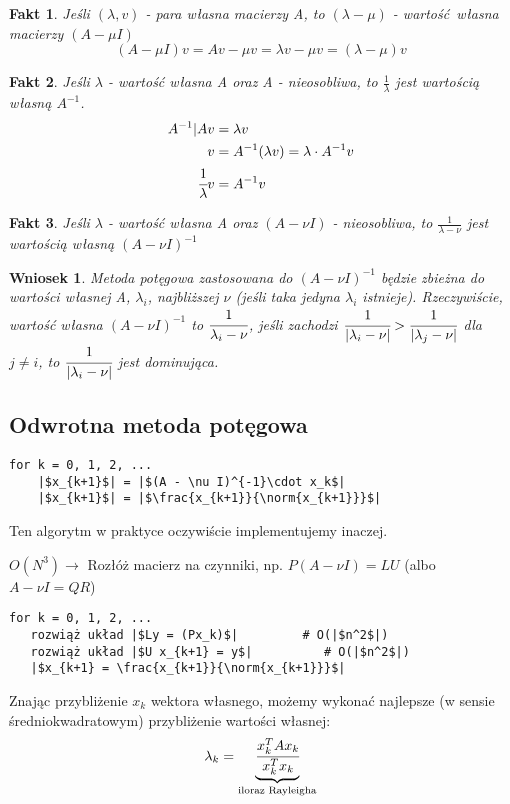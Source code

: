 \documentclass[hidelinks,a4paper,fleqn,oneside]{book}
\newcommand{\ra}{\rightarrow}
\newcommand{\norm}[1]{\left\lVert#1\right\rVert}
\newtheorem{wniosek}{Wniosek}
\newtheorem{fakt}{Fakt}
\begin{document}

\begin{fakt} 
	Jeśli $(\lambda, v)$ - para własna macierzy A, to $(\lambda - \mu)$ - wartość własna macierzy $(A - \mu I)$
	\[
		(A - \mu I)v = Av - \mu v = \lambda v - \mu v = (\lambda - \mu)v
	\]
\end{fakt} 

\begin{fakt} Jeśli $\lambda$ - wartość własna A oraz A - nieosobliwa, to $\frac{1}{\lambda}$ jest wartością własną $A^{-1}$.
	\begin{equation}
		\begin{aligned}
			A^{-1}| Av           & = \lambda v                                  \\
			v                    & = A^{-1}(\lambda v) = \lambda \cdot A^{-1} v \\
			\cfrac{1}{\lambda} v & = A^{-1}v                                    
		\end{aligned}
	\end{equation}
\end{fakt}

\begin{fakt} Jeśli $\lambda$ - wartość własna A oraz $(A - \nu I)$ - nieosobliwa, to $\frac{1}{\lambda - \nu}$ jest wartością własną $(A - \nu I)^{-1}$
\end{fakt}

\begin{wniosek} Metoda potęgowa zastosowana do $(A - \nu I)^{-1}$ będzie zbieżna do wartości własnej A, $\lambda_i$, najbliższej $\nu$ (jeśli taka jedyna $\lambda_i$ istnieje). Rzeczywiście, wartość własna $(A - \nu I)^{-1}$ to $\cfrac{1}{\lambda_i - \nu}$, jeśli zachodzi $\cfrac{1}{|\lambda_i - \nu|} > \cfrac{1}{|\lambda_j - \nu|}$ dla $j \neq i$, to $\cfrac{1}{|\lambda_i - \nu|}$ jest dominująca.
\end{wniosek}

\subsection{Odwrotna metoda potęgowa}
\begin{verbatim}
for k = 0, 1, 2, ...
    |$x_{k+1}$| = |$(A - \nu I)^{-1}\cdot x_k$|
    |$x_{k+1}$| = |$\frac{x_{k+1}}{\norm{x_{k+1}}}$|
\end{verbatim}
Ten algorytm w praktyce oczywiście implementujemy inaczej.

$O(N^3) \ra $ Rozłóż macierz na czynniki, np. $P(A-\nu I) = LU$ (albo $A - \nu I = QR$)
\begin{verbatim}
for k = 0, 1, 2, ...
   rozwiąż układ |$Ly = (Px_k)$|         # O(|$n^2$|)
   rozwiąż układ |$U x_{k+1} = y$|          # O(|$n^2$|)
   |$x_{k+1} = \frac{x_{k+1}}{\norm{x_{k+1}}}$|
\end{verbatim}
Znając przybliżenie $x_k$ wektora własnego, możemy wykonać najlepsze (w sensie średniokwadratowym) przybliżenie wartości własnej:
\[
	\lambda_k = \underbrace{\cfrac{x^T_k A x_k}{x_k^T x_k}}_{\textrm{iloraz Rayleigha}}
\]
\end{document}

